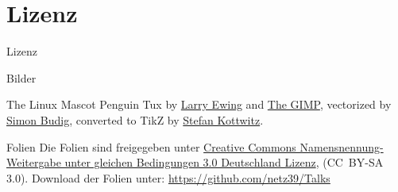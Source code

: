 \documentclass{beamer}
\begin{document}
\appendix

\section{Lizenz}

\begin{frame}{Lizenz}
    \begin{block}{Bilder}
        \begin{block}{The Linux Mascot}
            Penguin Tux by \href{mailto:lewing@isc.tamu.edu}{Larry Ewing}
            and \href{http://isc.tamu.edu/~lewing/linux/}{The GIMP},
            vectorized by
            \href{http://www.home.unix-ag.org/simon/}{Simon Budig},
            converted to TikZ by
            \href{http://www.texample.net/weblog/2012/apr/28/tux-tex-tikz/}{Stefan Kottwitz}.
        \end{block}
    \end{block}
    \begin{block}{Folien}
        Die Folien sind freigegeben unter
        \href{http://creativecommons.org/licenses/by-sa/3.0/de/}{Creative
        Commons Namensnennung-Weitergabe unter gleichen Bedingungen 3.0
        Deutschland Lizenz}, (CC\ BY-SA 3.0). Download der Folien unter:
        \url{https://github.com/netz39/Talks}
    \end{block}
\end{frame}
\end{document}
